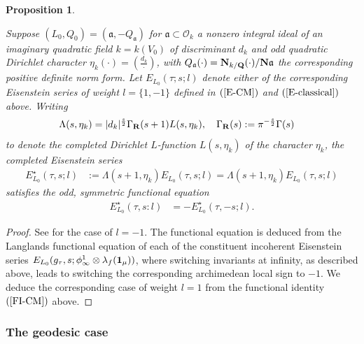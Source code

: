 \documentclass{amsart}
\newtheorem{proposition}[theorem]{Proposition}
\theoremstyle{definition}
\theoremstyle{definition}
\theoremstyle{definition}
\begin{document}
\begin{proposition}\label{LFE-CM}

Suppose $(L_0, Q_0) = (\mathfrak{a}, -Q_{\mathfrak{a}})$ for $\mathfrak{a} \subset \mathcal{O}_k$ a nonzero integral 
ideal of an imaginary quadratic field $k = k(V_0)$ of discriminant $d_k$ and odd quadratic Dirichlet character $\eta_k(\cdot) = \left( \frac{d_k}{\cdot} \right)$,
with $Q_{\mathfrak{a}}(\cdot) = {\bf{N}}_{k/{\bf{Q}}}(\cdot)/{\bf{N}} \mathfrak{a}$ the corresponding positive definite norm form. 
Let $E_{L_0}(\tau; s; l)$ denote either of the corresponding Eisenstein series of weight $l=\lbrace 1, -1\rbrace$ defined in $(\ref{E-CM})$ and $(\ref{E-classical})$ above. Writing
\begin{align*} \Lambda(s, \eta_k) 
&= \vert d_k \vert^{\frac{s}{2}} \Gamma_{\bf{R}} (s+1) L(s, \eta_k), \quad \Gamma_{\bf{R}}(s) := \pi^{-\frac{s}{2}} \Gamma(s)\end{align*}
to denote the completed Dirichlet $L$-function $L(s, \eta_k)$ of the character $\eta_k$, the completed Eisenstein series
\begin{align*} E_{L_0}^{\star}(\tau, s; l) &:= \Lambda(s+1, \eta_k) E_{L_0}(\tau, s; l) = \Lambda(s+1, \eta_k) E_{L_0}(\tau, s; l)\end{align*}
satisfies the odd, symmetric functional equation 
\begin{align*} E_{L_0}^{\star}(\tau,s: l) &= -E_{L_0}^{\star}(\tau, -s; l). \end{align*}

\end{proposition}

\begin{proof} See \cite[Proposition 2.5]{BY} for the case of $l=-1$. The functional equation is deduced from the Langlands functional equation of 
each of the constituent incoherent Eisenstein series $E_{L_0}(g_{\tau}, s; \phi_{\infty}^1 \otimes \lambda_f({\bf{1}}_{\mu}))$,
where switching invariants at infinity, as described above, leads to switching the corresponding archimedean local sign to $-1$. 
We deduce the corresponding case of weight $l=1$ from the functional identity $(\ref{FI-CM})$ above. \end{proof}

\subsubsection{The geodesic case} 
\end{document}
